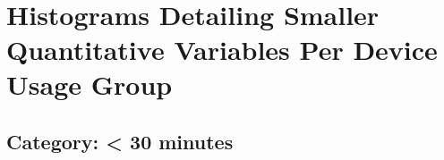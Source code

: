 \documentclass[11pt]{article}
\begin{document}
    \begin{center}
    \end{center}
    { \hspace*{\fill} \\}
    
    \hypertarget{histograms-detailing-smaller-quantitative-variables-per-device-usage-group}{%
\section{Histograms Detailing Smaller Quantitative Variables Per Device
Usage
Group}\label{histograms-detailing-smaller-quantitative-variables-per-device-usage-group}}

    \hypertarget{category-30-minutes}{%
\subsection{Category: \textless{} 30
minutes}\label{category-30-minutes}}
\end{document}
